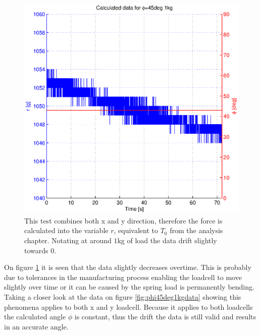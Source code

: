 \begin{figure}[H]
\centering
\includegraphics[scale=1]{graphics/gcs_test/phi45deg1kg.eps}
\caption[Test combines both $x$ and $y$ direction]{This test combines both x and y direction, therefore the force is calculated into the variable $r$, equivalent to $T_0$ from the analysis chapter. Notating at around $1$kg of load the data drift slightly towards 0.}
\label{fig:phi45deg1kg}
\end{figure}

\noindent
On figure \ref{fig:phi45deg1kg} it is seen that the data slightly decreases overtime. This is probably due to tolerances in the manufacturing process enabling the loadcell to move slightly over time or it can be caused by the spring load is permanently bending. Taking a closer look at the data on figure \ref{fig:phi45deg1kgdata} showing this phenomena applies to both x and y loadcell. Because it applies to both loadcells the calculated angle $\phi$ is constant, thus the drift the data is still valid and results in an accurate angle.

